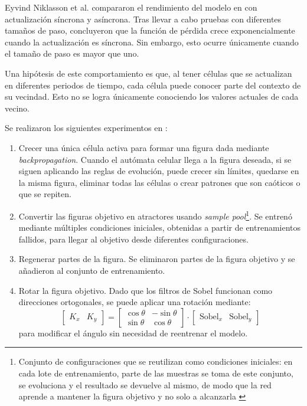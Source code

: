 Eyvind Niklasson et al. \cite{niklasson2021_nca} compararon el rendimiento del modelo en \cite{mordvintsev2020_nca} con actualización síncrona y asíncrona. Tras llevar a cabo pruebas con diferentes tamaños de paso, concluyeron que la función de pérdida crece exponencialmente cuando la actualización es síncrona. Sin embargo, esto ocurre únicamente cuando el tamaño de paso es mayor que uno.

Una hipótesis de este comportamiento es que, al tener células que se actualizan en diferentes periodos de tiempo, cada célula puede conocer parte del contexto de su vecindad. Esto no se logra únicamente conociendo los valores actuales de cada vecino.

Se realizaron los siguientes experimentos en \cite{mordvintsev2020_nca}:

\begin{enumerate}
	
	\item Crecer una única célula activa para formar una figura dada mediante \textit{backpropagation}. Cuando el autómata celular llega a la figura deseada, si se siguen aplicando las reglas de evolución, puede crecer sin límites, quedarse en la misma figura, eliminar todas las células o crear patrones que son caóticos o que se repiten.
	
	
	
	\item Convertir las figuras objetivo en atractores usando \textit{sample pool}\footnote{Conjunto de configuraciones que se reutilizan como condiciones iniciales: en cada lote de entrenamiento, parte de las muestras se toma de este conjunto, se evoluciona y el resultado se devuelve al mismo, de modo que la red aprende a mantener la figura objetivo y no solo a alcanzarla \cite{mordvintsev2020_nca}}. Se entrenó mediante múltiples condiciones iniciales, obtenidas a partir de entrenamientos fallidos, para llegar al objetivo desde diferentes configuraciones. 
	
	
	
	\item Regenerar partes de la figura. Se eliminaron partes de la figura objetivo y se añadieron al conjunto de entrenamiento.
	
	
	
	\item Rotar la figura objetivo. Dado que los filtros de Sobel funcionan como direcciones ortogonales, se puede aplicar una rotación mediante: 
	\[ \begin{bmatrix}
		K_x & K_y
	\end{bmatrix} = \begin{bmatrix}
		\cos \theta & -\sin \theta \\
		\sin \theta & \cos \theta
	\end{bmatrix} \cdot \begin{bmatrix}
		\text{Sobel}_x & \text{Sobel}_y
	\end{bmatrix} \]
	para modificar el ángulo sin necesidad de reentrenar el modelo.
	
\end{enumerate}

